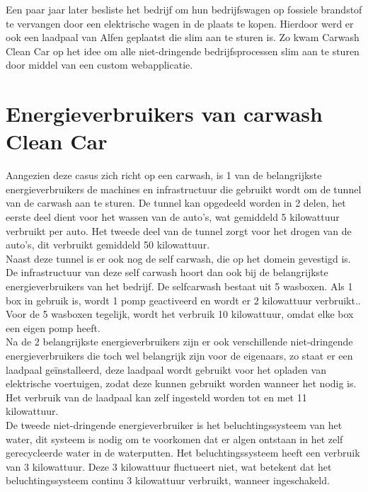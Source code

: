 Een paar jaar later besliste het bedrijf om hun bedrijfswagen op fossiele brandstof te vervangen door een elektrische wagen in de plaats te kopen. Hierdoor werd er ook een laadpaal van Alfen geplaatst die slim aan te sturen is. Zo kwam Carwash Clean Car op het idee om alle niet-dringende bedrijfsprocessen slim aan te sturen door middel van een custom webapplicatie.

\section{Energieverbruikers van carwash Clean Car}
\label{sec:stand-van-zaken-energieverbruikers}

Aangezien deze casus zich richt op een carwash, is 1 van de belangrijkste energieverbruikers de machines en infrastructuur die gebruikt wordt om de tunnel van de carwash aan te sturen. De tunnel kan opgedeeld worden in 2 delen, het eerste deel dient voor het wassen van de auto's, wat gemiddeld 5 kilowattuur verbruikt per auto. Het tweede deel van de tunnel zorgt voor het drogen van de auto's, dit verbruikt gemiddeld 50 kilowattuur.\\

Naast deze tunnel is er ook nog de self carwash, die op het domein gevestigd is. De infrastructuur van deze self carwash hoort dan ook bij de belangrijkste energieverbruikers van het bedrijf. De selfcarwash bestaat uit 5 wasboxen. Als 1 box in gebruik is, wordt 1 pomp geactiveerd en wordt er 2 kilowattuur verbruikt.. Voor de 5 wasboxen tegelijk, wordt het verbruik 10 kilowattuur, omdat elke box een eigen pomp heeft.\\

Na de 2 belangrijkste energieverbruikers zijn er ook verschillende niet-dringende energieverbruikers die toch wel belangrijk zijn voor de eigenaars, zo staat er een laadpaal geïnstalleerd, deze laadpaal wordt gebruikt voor het opladen van elektrische voertuigen, zodat deze kunnen gebruikt worden wanneer het nodig is. Het verbruik van de laadpaal kan zelf ingesteld worden tot en met 11 kilowattuur.\\

De tweede niet-dringende energieverbruiker is het beluchtingssysteem van het water, dit systeem is nodig om te voorkomen dat er algen ontstaan in het zelf gerecycleerde water in de waterputten. Het beluchtingssysteem heeft een verbruik van 3 kilowattuur. Deze 3 kilowattuur fluctueert niet, wat betekent dat het beluchtingssysteem continu 3 kilowattuur verbruikt, wanneer ingeschakeld.\\

